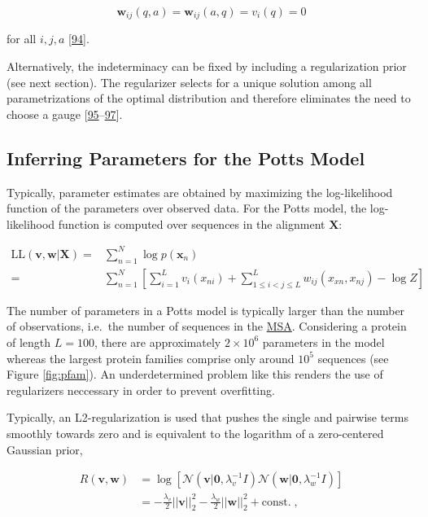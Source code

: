 \documentclass[11pt,a4paper,twoside]{book}
\newcommand{\seq}{\mathbf{x}}
\renewcommand{\v}{\mathbf{v}}
\newcommand{\vi}{v_{i}}
\newcommand{\w}{\mathbf{w}}
\newcommand{\wij}{\mathbf{w}_{ij}}
\theoremstyle{definition}
\theoremstyle{definition}
\theoremstyle{remark}
\begin{document}
\begin{equation}
    \wij(q,a) = \wij(a,q) = \vi(q) = 0
\label{eq:ising-gauge}
\end{equation}

for all \(i,j,a\) {[}\protect\hyperlink{ref-Cocco2017}{94}{]}.

Alternatively, the indeterminacy can be fixed by including a
regularization prior (see next section). The regularizer selects for a
unique solution among all parametrizations of the optimal distribution
and therefore eliminates the need to choose a gauge
{[}\protect\hyperlink{ref-Koller2009}{95}--\protect\hyperlink{ref-Stein2015a}{97}{]}.

\subsection{Inferring Parameters for the Potts Model}\label{potts-mle}

Typically, parameter estimates are obtained by maximizing the
log-likelihood function of the parameters over observed data. For the
Potts model, the log-likelihood function is computed over sequences in
the alignment \(\mathbf{X}\):

\begin{align}
    \text{LL}(\v, \w | \mathbf{X}) =& \sum_{n=1}^N \log p(\seq_n)  \nonumber\\
    =& \sum_{n=1}^N \left[ \sum_{i=1}^L v_i(x_{ni}) + \sum_{1 \leq i < j \leq L}^L w_{ij}(x_{xn}, x_{nj}) - \log Z \right]
\label{eq:full-log-likelihood}
\end{align}

The number of parameters in a Potts model is typically larger than the
number of observations, i.e.~the number of sequences in the
\protect\hyperlink{abbrev}{MSA}. Considering a protein of length
\(L=100\), there are approximately \(2 \times 10^6\) parameters in the
model whereas the largest protein families comprise only around \(10^5\)
sequences (see Figure \ref{fig:pfam}). An underdetermined problem like
this renders the use of regularizers neccessary in order to prevent
overfitting.

Typically, an L2-regularization is used that pushes the single and
pairwise terms smoothly towards zero and is equivalent to the logarithm
of a zero-centered Gaussian prior,

\begin{align}
  R(\v, \w)  &= \log \left[ \mathcal{N}(\v | \mathbf{0}, \lambda_v^{-1} I) \mathcal{N}(\w | \mathbf{0}, \lambda_w^{-1} I) \right] \nonumber \\
             &= -\frac{\lambda_v}{2} ||\v||_2^2 - \frac{\lambda_w}{2} ||\w||_2^2 + \text{const.} \; ,
\label{eq:l2-reg}
\end{align}
\end{document}
